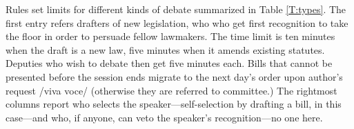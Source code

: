 \documentclass[letter,12pt]{article}
\begin{document}


Rules set limits for different kinds of debate summarized in Table \ref{T:types}. The first entry refers drafters of new legislation, who who get first recognition to take the floor in order to persuade fellow lawmakers. The time limit is ten minutes when the draft is a new law, five minutes when it amends existing statutes. Deputies who wish to debate then get five minutes each. Bills that cannot be presented before the session ends migrate to the next day's order upon author's request /viva voce/ (otherwise they are referred to committee.) The rightmost columns report who selects the speaker---self-selection by drafting a bill, in this case---and who, if anyone, can veto the speaker's recognition---no one here. 
\end{document}
